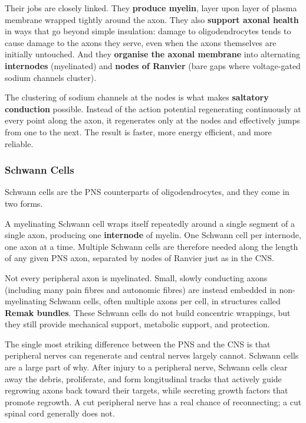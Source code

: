 \documentclass[11pt]{article}
\begin{document}
Their jobs are closely linked. They \textbf{produce myelin}, layer upon layer of plasma membrane wrapped tightly around the axon. They also \textbf{support axonal health} in ways that go beyond simple insulation: damage to oligodendrocytes tends to cause damage to the axons they serve, even when the axons themselves are initially untouched. And they \textbf{organise the axonal membrane} into alternating \textbf{internodes} (myelinated) and \textbf{nodes of Ranvier} (bare gaps where voltage-gated sodium channels cluster).

The clustering of sodium channels at the nodes is what makes \textbf{saltatory conduction} possible. Instead of the action potential regenerating continuously at every point along the axon, it regenerates only at the nodes and effectively jumps from one to the next. The result is faster, more energy efficient, and more reliable.

\subsubsection{Schwann Cells}

Schwann cells are the PNS counterparts of oligodendrocytes, and they come in two forms.

A myelinating Schwann cell wraps itself repeatedly around a single segment of a single axon, producing one \textbf{internode} of myelin. One Schwann cell per internode, one axon at a time. Multiple Schwann cells are therefore needed along the length of any given PNS axon, separated by nodes of Ranvier just as in the CNS.

Not every peripheral axon is myelinated. Small, slowly conducting axons (including many pain fibres and autonomic fibres) are instead embedded in non-myelinating Schwann cells, often multiple axons per cell, in structures called \textbf{Remak bundles}. These Schwann cells do not build concentric wrappings, but they still provide mechanical support, metabolic support, and protection.

The single most striking difference between the PNS and the CNS is that peripheral nerves can regenerate and central nerves largely cannot. Schwann cells are a large part of why. After injury to a peripheral nerve, Schwann cells clear away the debris, proliferate, and form longitudinal tracks that actively guide regrowing axons back toward their targets, while secreting growth factors that promote regrowth. A cut peripheral nerve has a real chance of reconnecting; a cut spinal cord generally does not.
\end{document}
